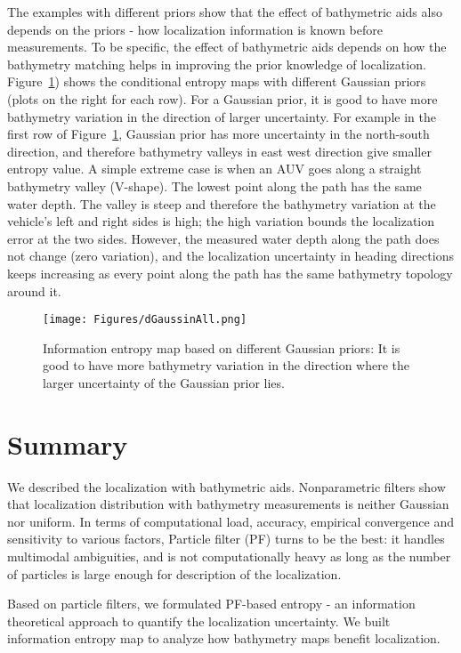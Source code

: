 The examples with different priors show that the effect of bathymetric aids also depends on the priors - how localization information is known before measurements. To be specific, the effect of bathymetric aids depends on how the bathymetry matching helps in improving the prior knowledge of localization. Figure~\ref{fig:dGaussianAll}) shows the conditional entropy maps with different Gaussian priors (plots on the right for each row). For a Gaussian prior, it is good to have more bathymetry variation in the direction of larger uncertainty. For example in the first row of Figure~\ref{fig:dGaussianAll}, Gaussian prior has more uncertainty in the north-south direction, and therefore bathymetry valleys in east west direction give smaller entropy value. A simple extreme case is when an AUV goes along a straight bathymetry valley (V-shape). The lowest point along the path has the same water depth. The valley is steep and therefore the bathymetry variation at the vehicle's left and right sides is high; the high variation bounds the localization error at the two sides. However, the measured water depth along the path does not change (zero variation), and the localization uncertainty in heading directions keeps increasing as every point along the path has the same bathymetry topology around it.

\begin{figure}[htbp]
\centering
\texttt{[image: Figures/dGaussinAll.png]}
\caption{Information entropy map based on different Gaussian priors: It is good to have more bathymetry variation in the direction where the larger uncertainty of the Gaussian prior lies.}
\label{fig:dGaussianAll}
\end{figure}

\section{Summary}

We described the localization with bathymetric aids. Nonparametric filters show that localization distribution with bathymetry measurements is neither Gaussian nor uniform. In terms of computational load, accuracy, empirical convergence and sensitivity to various factors, Particle filter (PF) turns to be the best: it handles multimodal ambiguities, and is not computationally heavy as long as the number of particles is large enough for description of the localization.

Based on particle filters, we formulated PF-based entropy - an information theoretical approach to quantify the localization uncertainty. We built information entropy map to analyze how bathymetry maps benefit localization.